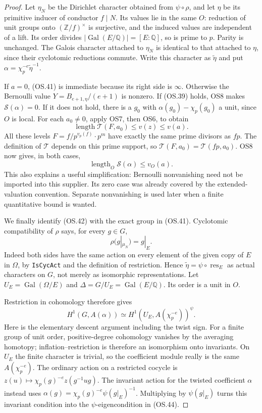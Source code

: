 \begin{proof}
Let $\eta_N$ be the Dirichlet character obtained from
$\psi\circ\rho$, and let $\eta$ be its primitive inducer of
conductor $f\mid N$.  Its values lie in the same $O$:
reduction of unit groups onto $(\mathbb Z/f)^\times$ is surjective,
and the induced values are independent of a lift.
Its order divides $|\operatorname{Gal}(E/\mathbb Q)|=[E:\mathbb Q]$,
so is prime to $p$.  Parity is unchanged.
The Galois character attached to $\eta_N$ is identical to that
attached to $\eta$, since their cyclotomic reductions commute.
Write this character as $\widetilde\eta$ and put
$\alpha=\chi_p^{-e}\widetilde\eta^{-1}$.

If $a=0$, (OS.41) is immediate because its right side is $\infty$.
Otherwise the Bernoulli value $Y=B_{e+1,\eta}/(e+1)$ is nonzero.
If (OS.39) holds, OS8 makes $\mathscr S(\alpha)=0$.
If it does not hold, there is a $g_0$ with
$\alpha(g_0)-\chi_p(g_0)$ a unit, since $O$ is local.
For each $a_0\ne0$, apply OS7, then OS6, to obtain
\[
 \operatorname{length}\mathcal T(F,a_0)
                    \le v(z)\le v(a).
\]
All these levels $F=f/p^{v_p(f)}\cdot p^m$ have exactly the
same prime divisors as $fp$.  The definition of $\mathcal T$
depends on this prime support, so
$\mathcal T(F,a_0)=\mathcal T(fp,a_0)$.
OS8 now gives, in both cases,
\[
                   \operatorname{length}_O\mathscr S(\alpha)
                                      \le v_O(a).
 \tag{OS.42}
\]
This also explains a useful simplification: Bernoulli nonvanishing
need not be imported into this supplier.  Its zero case was already
covered by the extended-valuation convention.  Separate nonvanishing
is used later when a finite quantitative bound is wanted.

We finally identify (OS.42) with the exact group in (OS.41).
Cyclotomic compatibility of $\rho$ says, for every $g\in G$,
\[
                  \rho(g|_{\mu_N})=g|_E.
 \tag{OS.43}
\]
Indeed both sides have the same action on every element of the
given copy of $E$ in $\Omega$, by \texttt{IsCycAct} and the
definition of restriction.  Hence
$\widetilde\eta=\psi\circ\operatorname{res}_E$ as actual
characters on $G$, not merely as isomorphic representations.
Let $U_E=\operatorname{Gal}(\Omega/E)$ and
$\Delta=G/U_E=\operatorname{Gal}(E/\mathbb Q)$.
Its order is a unit in $O$.

Restriction in cohomology therefore gives
\[
 H^1(G,A(\alpha))\simeq H^1(U_E,A(\chi_p^{-e}))^{\psi}.
 \tag{OS.44}
\]
Here is the elementary descent argument including the twist sign.
For a finite group of unit order, positive-degree cohomology
vanishes by the averaging homotopy; inflation--restriction is
therefore an isomorphism onto invariants.
On $U_E$ the finite character is trivial, so the coefficient
module really is the same $A(\chi_p^{-e})$.
The ordinary action on a restricted cocycle is
$z(u)\mapsto\chi_p(g)^{-e}z(g^{-1}ug)$.
The invariant action for the twisted coefficient $\alpha$ instead
uses $\alpha(g)=\chi_p(g)^{-e}\psi(g|_E)^{-1}$.
Multiplying by $\psi(g|_E)$ turns this invariant condition into
the $\psi$-eigencondition in (OS.44).


\end{proof}
